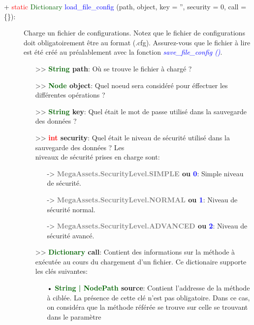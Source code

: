 \documentclass[a4paper, 11pt]{article}
\begin{document}
	\begin{description}
		\item [+ \textcolor{red}{static} \textcolor{darkgreen}{Dictionary} \textcolor{blue}
		{load\_file\_config} (path, object, key = '', security = 0, call = \{\}):] Charge un fichier de
		configurations. Notez que le fichier de configurations doit obligatoirement être au format (.cfg). 
		Assurez-vous que le fichier à lire est été créé au préalablement avec la fonction \textcolor{blue}
		{\textit{save\_file\_config ()}}.
		\begin{itemize}
			\item [>> \textbf{\textcolor{darkgreen}{String} path}:] Où se trouve le fichier à chargé ?
			\item [>> \textbf{\textcolor{darkgreen}{Node} object}:] Quel noeud sera considéré pour éffectuer
			les différentes opérations ?
			\item [>> \textbf{\textcolor{darkgreen}{String} key}:] Quel était le mot de passe utilisé dans 
			la sauvegarde des données ?
			\item [>> \textbf{\textcolor{red}{int} security}:] Quel était le niveau de sécurité utilisé dans 
			la sauvegarde des données ? Les \\niveaux de sécurité prises en charge sont:
			\begin{itemize}
				\item [-> \textbf{\textcolor{gray}{MegaAssets.SecurityLevel.SIMPLE} ou \textcolor{blue}
				{0}}:] Simple niveau de sécurité.
				\item [-> \textbf{\textcolor{gray}{MegaAssets.SecurityLevel.NORMAL} ou \textcolor{blue}
				{1}}:] Niveau de sécurité normal.
				\item [-> \textbf{\textcolor{gray}{MegaAssets.SecurityLevel.ADVANCED} ou \textcolor{blue}
				{2}}:] Niveau de sécurité avancé.
			\end{itemize}
			\item [>> \textbf{\textcolor{darkgreen}{Dictionary} call}:] Contient des informations sur la
			méthode à exécutée au cours du chargement d'un fichier. Ce dictionaire supporte les clés
			suivantes:
			\begin{itemize}
			   \item[• \textbf{\textcolor{darkgreen}{String | NodePath} source}:] Contient l'addresse de la
			   méthode à ciblée. La présence de cette clé n'est pas obligatoire. Dans ce cas, on considéra
			   que la méthode référée se trouve sur celle se trouvant dans le paramètre

\end{itemize}
\end{itemize}
\end{description}
\end{document}
